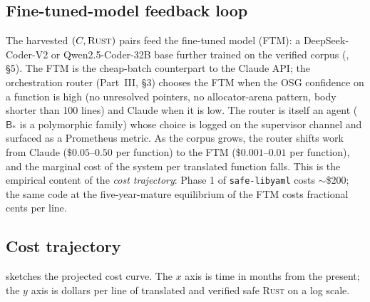 \documentclass[12pt]{article}
\theoremstyle{definition}
\theoremstyle{remark}
\newcommand{\rust}{\textnormal{\textsc{Rust}}}
\newcommand{\safelibyaml}{\texttt{safe-libyaml}}
\newcommand{\Agent}[1]{\ensuremath{\mathsf{#1}}}
\begin{document}
\subsection{Fine-tuned-model feedback loop}

The harvested $(C, \rust)$ pairs feed the fine-tuned model (FTM): a
DeepSeek-Coder-V2 or Qwen2.5-Coder-32B base further trained on the
verified corpus (\cite{ferrousdevplan2026}, \S{}5). The FTM is the
cheap-batch counterpart to the Claude API; the orchestration router
(Part~III, \S{}3) chooses the FTM when the OSG confidence on a
function is high (no unresolved pointers, no allocator-arena pattern,
body shorter than 100 lines) and Claude when it is low. The router is
itself an agent (\(\Agent{B}_*\) is a polymorphic family) whose choice
is logged on the supervisor channel and surfaced as a Prometheus
metric. As the corpus grows, the router shifts work from Claude
($\$0.05$--$0.50$ per function) to the FTM ($\$0.001$--$0.01$ per
function), and the marginal cost of the system per translated function
falls. This is the empirical content of the \emph{cost trajectory}:
Phase 1 of \safelibyaml{} costs $\sim$\$200; the same code at the
five-year-mature equilibrium of the FTM costs fractional cents per
line.

\subsection{Cost trajectory}

 sketches the projected cost curve. The $x$
axis is time in months from the present; the $y$ axis is dollars per
line of translated and verified safe \rust{} on a log scale.
\end{document}

